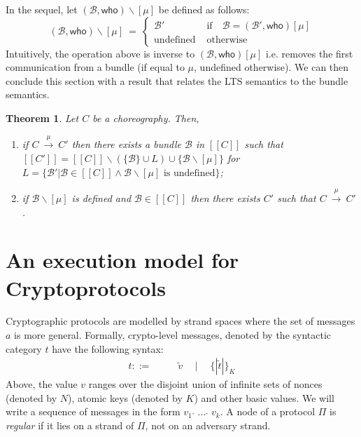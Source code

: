 \documentclass[copyright]{eptcs}
\newtheorem{theorem}{Theorem}
\newcommand{\cons}{\,{\hat{\ }}\,}
\newcommand{\enc}[2]{\{\!\!|#1|\!\!\}_{#2}}
\newcommand{\sembrack}[1]{[\![#1]\!]}
\newcommand{\lts}[1]{\ \stackrel{#1}\longrightarrow\ }
\newcommand{\pp}{\mathrel{\boldsymbol{\mathord{\mid}}}}
\newcommand{\who}{\mathsf{who}}
\newcommand{\NI}{\noindent}
\begin{document}
\NI In the sequel, let $(\mathcal B,\who)\backslash[\mu]$ be defined
as follows: 
\begin{equation*}
  (\mathcal B,\who)\backslash[\mu]\ = \
  \left\{
  \begin{array}{ll}
    \mathcal B'       & \text{ if}\quad\mathcal B = (\mathcal B',\who)[\mu]\\
    \text{undefined}  & \text{ otherwise}
  \end{array}
  \right.
\end{equation*}
Intuitively, the operation above is inverse to $(\mathcal
B,\who)[\mu]$ i.e. removes the first communication from a bundle (if
equal to $\mu$, undefined otherwise). We can then conclude this
section with a result that relates the LTS semantics to the bundle
semantics. 
\begin{theorem}\label{theorem}
  Let $C$ be a choreography. Then, 
  \begin{enumerate}

  \item if $C\lts{\mu}C'$ then there exists a bundle $\mathcal B$ in
    $\sembrack{C}$ such that
    $\sembrack{C'}=\sembrack{C}\backslash(\{\mathcal B\}\cup
    L)\cup\{\mathcal B\backslash[\mu]\}$ for $L = \{\mathcal B'\pp
    \mathcal B\in\sembrack{C}\land\mathcal B\backslash[\mu]\text{ is
      undefined}\}$;

  \item if $\mathcal B\backslash[\mu]$ is defined and $\mathcal
    B\in\sembrack{C}$ then there exists $C'$ such that $C\lts\mu C'$.

  \end{enumerate}
\end{theorem} 



\section{An execution model for Cryptoprotocols}
\label{sec:cryptoprotocols}


Cryptographic protocols are modelled by strand spaces where the set of
messages $a$ is more general. Formally, crypto-level messages, denoted
by the syntactic category $t$ have the following syntax:
\begin{align*}
  t::= & \phantom{{}\mid\quad{}}\tilde v\quad\mid\quad \enc{\tilde
    t}{K}
\end{align*}
Above, the value $v$ ranges over the disjoint union of infinite sets
of nonces (denoted by $N$), atomic keys (denoted by $K$) and other
basic values.  We will write a sequence of messages in the form
$v_1\cons\ldots\cons v_k$. A node of a protocol $\Pi$ is
\emph{regular} if it lies on a strand of $\Pi$, not on an adversary
strand.
\end{document}

